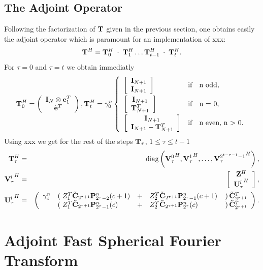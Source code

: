 \subsection{The Adjoint Operator}
Following the factorization of $\mathbf{T}$ given in the previous section, one obtains easily the adjoint operator which is paramount for an implementation of xxx: 
$$\mathbf{T}^H = \mathbf{T}_{0}^H \; \cdot \; \mathbf{T}_{1}^H \dots \mathbf{T}_{t-1}^H \; \cdot \; \mathbf{T}_{t}^H.$$ For $\tau = 0$ and $\tau = t$ we obtain immediatly
$$ \mb{T}_{0}^H = \left( \begin{array}{c} \mb{I}_{N} \otimes \mb{e}_{1}^T\\ \mb{\tilde{e}}^T \end{array}\right), \mb{T}_{t}^H = \gamma_{0}^n \left\{\begin{array}{l@{\quad \text{if} \quad}l} 
 \left[ \begin{array}{c} \mb{I}_{N+1} \\ \mb{I}_{N+1} \end{array} \right] & \text{n odd},\\[2ex]
 \left[ \begin{array}{c} \mb{I}_{N+1} \\ \mb{T}_{N+1}^T \end{array} \right] & \text{n = 0},\\[2ex]
 \left[ \begin{array}{c} \mb{I}_{N+1} \\ \mb{I}_{N+1} - \mb{T}_{N+1}^T \end{array} \right] & \text{n even, n > 0}.
\end{array}\right.$$
Using xxx we get for the rest of the steps $\mathbf{T}_{\tau}$, $1 \le \tau \le t-1$
\begin{eqnarray*}
 \mathbf{T}_{\tau}^H & = & \text{diag}\left({\mathbf{V}_{\tau}^0}^H,{\mathbf{V}_{\tau}^1}^H,\dots,{\mathbf{V}_{\tau}^{2^{t-\tau-1}-1}}^H\right),\\
 {\mathbf{V}_{\tau}^l}^H & = & \left[ \begin{array}{c} \mathbf{Z}^H \\ { \mathbf{U}_{\tau}^l}^H \end{array} \right],\\
 {\mathbf{U}_{\tau}^l}^H & = &
   \left(
     \begin{array}{rlllr}
        \gamma_{c}^n & \left(\right. Z_{1}^T \mathbf{\tilde{C}}_{2^{\tau+1}} \mathbf{P}_{2^{\tau}-2}^n(c+1)   & + & Z_{2}^T \mathbf{\tilde{C}}_{2^{\tau+1}} \mathbf{P}_{2^{\tau}-1}^n(c+1)
         & \left.\right) \mathbf{\tilde{C}}_{2^{\tau+1}}^T \\
        & \left(\right. Z_{1}^T \mathbf{\tilde{C}}_{2^{\tau+1}} \mathbf{P}_{2^{\tau}-1}^n(c) & + & Z_{2}^T \mathbf{\tilde{C}}_{2^{\tau+1}} \mathbf{P}_{2^{\tau}}^n(c) & \left.\right) \mathbf{\tilde{C}}_{2^{\tau+1}}^T
     \end{array}
   \right).
\end{eqnarray*}


\section{Adjoint Fast Spherical Fourier Transform}
\label{DSFT:AdjointTransform}
